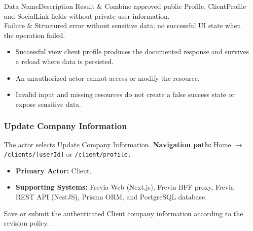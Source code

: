 \begin{specdatatable}{Data Name}{Description}
Result & Combine approved public Profile, ClientProfile and SocialLink fields without private user information.\\ \hline
Failure & Structured error without sensitive data; no successful UI state when the operation failed.\\ \hline
\end{specdatatable}

\begin{itemize}[leftmargin=1.6em,topsep=3pt,itemsep=2pt,parsep=0pt,label=$\bullet$]
    \item Successful view client profile produces the documented response and survives a reload where data is persisted.
    \item An unauthorized actor cannot access or modify the resource.
    \item Invalid input and missing resources do not create a false success state or expose sensitive data.
\end{itemize}

\subsubsection{Update Company Information}

The actor selects Update Company Information.\newline
\textbf{Navigation path:} Home $\rightarrow$ \texttt{/\allowbreak{}clients/\allowbreak{}[userId]} or \texttt{/\allowbreak{}client/\allowbreak{}profile.}


\begin{itemize}[leftmargin=1.6em,topsep=3pt,itemsep=2pt,parsep=0pt,label=$\bullet$]
    \item \textbf{Primary Actor:} Client.
    \item \textbf{Supporting Systems:} Frevia Web (Next.js), Frevia BFF proxy, Frevia REST API (NestJS), Prisma ORM, and PostgreSQL database.
\end{itemize}

\noindent Save or submit the authenticated Client company information according to the revision policy.

